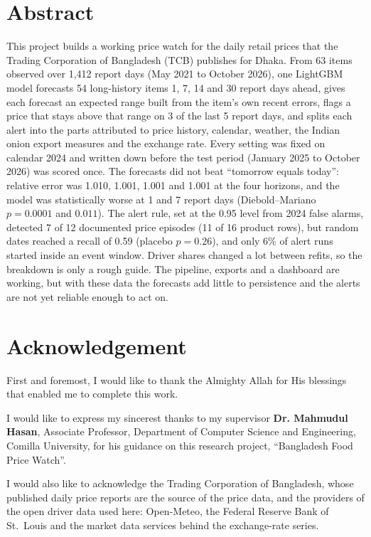 \documentclass[12pt]{report}
\begin{document}
\chapter*{Abstract}%
%
This project builds a working price watch for the daily retail prices that the Trading Corporation of Bangladesh (TCB) publishes for Dhaka. From 63 items observed over 1,412 report days (May 2021 to October 2026), one LightGBM model forecasts 54 long-history items 1, 7, 14 and 30 report days ahead, gives each forecast an expected range built from the item's own recent errors, flags a price that stays above that range on 3 of the last 5 report days, and splits each alert into the parts attributed to price history, calendar, weather, the Indian onion export measures and the exchange rate. Every setting was fixed on calendar 2024 and written down before the test period (January 2025 to October 2026) was scored once. The forecasts did not beat ``tomorrow equals today'': relative error was 1.010, 1.001, 1.001 and 1.001 at the four horizons, and the model was statistically worse at 1 and 7 report days (Diebold--Mariano $p=0.0001$ and $0.011$). The alert rule, set at the 0.95 level from 2024 false alarms, detected 7 of 12 documented price episodes (11 of 16 product rows), but random dates reached a recall of 0.59 (placebo $p=0.26$), and only 6\% of alert runs started inside an event window. Driver shares changed a lot between refits, so the breakdown is only a rough guide. The pipeline, exports and a dashboard are working, but with these data the forecasts add little to persistence and the alerts are not yet reliable enough to act on.

\chapter*{Acknowledgement}
First and foremost, I would like to thank the Almighty Allah for His blessings that enabled me to complete this work.

\noindent I would like to express my sincerest thanks to my supervisor \textbf{Dr. Mahmudul Hasan}, Associate Professor, Department of Computer Science and Engineering, Comilla University, for his guidance on this research project, ``Bangladesh Food Price Watch''.

\noindent I would also like to acknowledge the Trading Corporation of Bangladesh, whose published daily price reports are the source of the price data, and the providers of the open driver data used here: Open-Meteo, the Federal Reserve Bank of St.\ Louis and the market data services behind the exchange-rate series.
\end{document}
